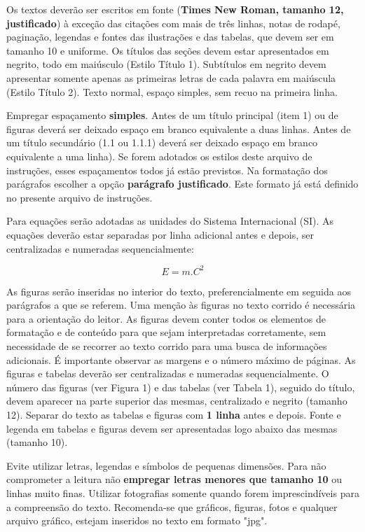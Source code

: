 \documentclass[10pt,brazil,english]{article}
\begin{document}
Os textos deverão ser escritos em fonte (\textbf{Times New Roman, tamanho 12, justificado}) à exceção das citações com mais de três linhas, notas de rodapé, paginação, legendas e fontes das ilustrações e das tabelas, que devem ser em tamanho 10 e uniforme. Os títulos das seções devem estar apresentados em negrito, todo em maiúsculo (Estilo Título 1). Subtítulos em negrito devem apresentar somente apenas as primeiras letras de cada palavra em maiúscula (Estilo Título 2). Texto normal, espaço simples, sem recuo na primeira linha.

Empregar espaçamento \textbf{simples}. Antes de um título principal (item 1) ou de figuras deverá ser deixado espaço em branco equivalente a duas linhas. Antes de um título secundário (1.1 ou 1.1.1) deverá ser deixado espaço em branco equivalente a uma linha). Se forem adotados os estilos deste arquivo de instruções, esses espaçamentos todos já estão previstos. Na formatação dos parágrafos escolher a opção \textbf{parágrafo justificado}. Este formato já está definido no presente arquivo de instruções.

Para equações serão adotadas as unidades do Sistema Internacional (SI). As equações deverão estar separadas por linha adicional antes e depois, ser centralizadas e numeradas sequencialmente:


\begin{equation}
E=m.C^{2}
\end{equation}

As figuras serão inseridas no interior do texto, preferencialmente em seguida aos parágrafos a que se referem. Uma menção às figuras no texto corrido é necessária para a orientação do leitor. As figuras devem conter todos os elementos de formatação e de conteúdo para que sejam interpretadas corretamente, sem necessidade de se recorrer ao texto corrido para uma busca de informações adicionais. É importante observar as margens e o número máximo de páginas. As figuras e tabelas deverão ser centralizadas e numeradas sequencialmente. O número das figuras (ver Figura 1) e das tabelas (ver Tabela 1), seguido do título, devem aparecer na parte superior das mesmas, centralizado e negrito (tamanho 12). Separar do texto as tabelas e figuras com \textbf{1 linha} antes e depois. Fonte e legenda em tabelas e figuras devem ser apresentadas logo abaixo das mesmas (tamanho 10).

Evite utilizar letras, legendas e símbolos de pequenas dimensões. Para não comprometer a leitura não \textbf{empregar letras menores que tamanho 10} ou linhas muito finas. Utilizar fotografias somente quando forem imprescindíveis para a compreensão do texto. Recomenda-se que gráficos, figuras, fotos e qualquer arquivo gráfico, estejam inseridos no texto em formato "jpg".
\end{document}
